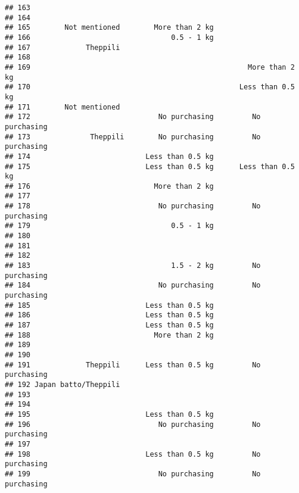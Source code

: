 \documentclass[
]{article}
\begin{document}
\begin{verbatim}
## 163                                                                 
## 164                                                                 
## 165        Not mentioned        More than 2 kg                      
## 166                                 0.5 - 1 kg                      
## 167             Theppili                                            
## 168                                                                 
## 169                                                   More than 2 kg
## 170                                                 Less than 0.5 kg
## 171        Not mentioned                                            
## 172                              No purchasing         No purchasing
## 173              Theppili        No purchasing         No purchasing
## 174                           Less than 0.5 kg                      
## 175                           Less than 0.5 kg      Less than 0.5 kg
## 176                             More than 2 kg                      
## 177                                                                 
## 178                              No purchasing         No purchasing
## 179                                 0.5 - 1 kg                      
## 180                                                                 
## 181                                                                 
## 182                                                                 
## 183                                 1.5 - 2 kg         No purchasing
## 184                              No purchasing         No purchasing
## 185                           Less than 0.5 kg                      
## 186                           Less than 0.5 kg                      
## 187                           Less than 0.5 kg                      
## 188                             More than 2 kg                      
## 189                                                                 
## 190                                                                 
## 191             Theppili      Less than 0.5 kg         No purchasing
## 192 Japan batto/Theppili                                            
## 193                                                                 
## 194                                                                 
## 195                           Less than 0.5 kg                      
## 196                              No purchasing         No purchasing
## 197                                                                 
## 198                           Less than 0.5 kg         No purchasing
## 199                              No purchasing         No purchasing

\end{verbatim}
\end{document}
